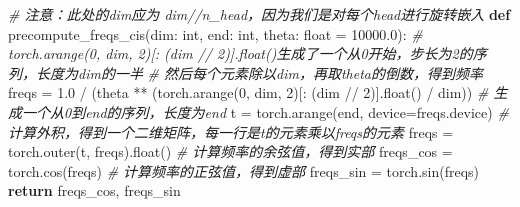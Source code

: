 \documentclass[
]{article}
\newenvironment{Shaded}{}{}
\newcommand{\BuiltInTok}[1]{\textcolor[rgb]{0.00,0.50,0.00}{#1}}
\newcommand{\CommentTok}[1]{\textcolor[rgb]{0.38,0.63,0.69}{\textit{#1}}}
\newcommand{\ControlFlowTok}[1]{\textcolor[rgb]{0.00,0.44,0.13}{\textbf{#1}}}
\newcommand{\DecValTok}[1]{\textcolor[rgb]{0.25,0.63,0.44}{#1}}
\newcommand{\FloatTok}[1]{\textcolor[rgb]{0.25,0.63,0.44}{#1}}
\newcommand{\KeywordTok}[1]{\textcolor[rgb]{0.00,0.44,0.13}{\textbf{#1}}}
\newcommand{\NormalTok}[1]{#1}
\newcommand{\OperatorTok}[1]{\textcolor[rgb]{0.40,0.40,0.40}{#1}}
\begin{document}
\begin{Shaded}
\begin{Highlighting}[]
\CommentTok{\# 注意：此处的dim应为 dim//n\_head，因为我们是对每个head进行旋转嵌入}
\KeywordTok{def}\NormalTok{ precompute\_freqs\_cis(dim: }\BuiltInTok{int}\NormalTok{, end: }\BuiltInTok{int}\NormalTok{, theta: }\BuiltInTok{float} \OperatorTok{=} \FloatTok{10000.0}\NormalTok{):}
    \CommentTok{\# torch.arange(0, dim, 2)[: (dim // 2)].float()生成了一个从0开始，步长为2的序列，长度为dim的一半}
    \CommentTok{\# 然后每个元素除以dim，再取theta的倒数，得到频率}
\NormalTok{    freqs }\OperatorTok{=} \FloatTok{1.0} \OperatorTok{/}\NormalTok{ (theta }\OperatorTok{**}\NormalTok{ (torch.arange(}\DecValTok{0}\NormalTok{, dim, }\DecValTok{2}\NormalTok{)[: (dim }\OperatorTok{//} \DecValTok{2}\NormalTok{)].}\BuiltInTok{float}\NormalTok{() }\OperatorTok{/}\NormalTok{ dim))}
    \CommentTok{\# 生成一个从0到end的序列，长度为end}
\NormalTok{    t }\OperatorTok{=}\NormalTok{ torch.arange(end, device}\OperatorTok{=}\NormalTok{freqs.device)}
    \CommentTok{\# 计算外积，得到一个二维矩阵，每一行是t的元素乘以freqs的元素}
\NormalTok{    freqs }\OperatorTok{=}\NormalTok{ torch.outer(t, freqs).}\BuiltInTok{float}\NormalTok{()}
    \CommentTok{\# 计算频率的余弦值，得到实部}
\NormalTok{    freqs\_cos }\OperatorTok{=}\NormalTok{ torch.cos(freqs)}
    \CommentTok{\# 计算频率的正弦值，得到虚部}
\NormalTok{    freqs\_sin }\OperatorTok{=}\NormalTok{ torch.sin(freqs)}
    \ControlFlowTok{return}\NormalTok{ freqs\_cos, freqs\_sin}
\end{Highlighting}
\end{Shaded}
\end{document}
